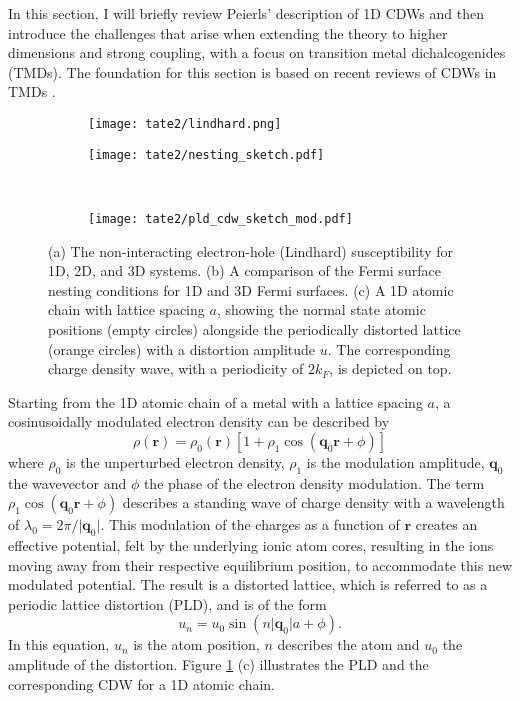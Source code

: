 In this section, I will briefly review Peierls' description of 1D CDWs and then introduce the challenges that arise when extending the theory to higher dimensions and strong coupling, with a focus on transition metal dichalcogenides (TMDs).
The foundation for this section is based on recent reviews of CDWs in TMDs \cite{rossnagel_origin_2011, canadell_importance_1992}.


\begin{figure}[t]
	\centering
	\begin{subfigure}[b]{0.45\textwidth}
		\texttt{[image: tate2/lindhard.png]}
	\end{subfigure}
	\hfill
	\begin{subfigure}[b]{0.5\textwidth}
		\texttt{[image: tate2/nesting\_sketch.pdf]}
	\end{subfigure}
	\\
	\begin{subfigure}[b]{0.9\textwidth}
		\texttt{[image: tate2/pld\_cdw\_sketch\_mod.pdf]}
	\end{subfigure}
	\caption{(a) The non-interacting electron-hole (Lindhard) susceptibility for 1D, 2D, and 3D systems. (b) A comparison of the Fermi surface nesting conditions for 1D and 3D Fermi surfaces. (c) A 1D atomic chain with lattice spacing $a$, showing the normal state atomic positions (empty circles) alongside the periodically distorted lattice (orange circles) with a distortion amplitude $u$. The corresponding charge density wave, with a periodicity of $2k_F$, is depicted on top.}
	\label{fig:cdw_theory}
\end{figure}

Starting from the 1D atomic chain of a metal with a lattice spacing $a$, a cosinusoidally modulated electron density can be described by
\begin{equation}
	\rho(\mathbf{r}) = \rho_0(\mathbf{r})[1+\rho_1 \cos(\mathbf{q}_0\mathbf{r}+\phi)]
	\label{eq:cdw}
\end{equation}
where $\rho_0$ is the unperturbed electron density, $\rho_1$ is the modulation amplitude, $\mathbf{q}_0$ the wavevector and $\phi$ the phase of the electron density modulation.
The term $\rho_1 \cos(\mathbf{q}_0\mathbf{r}+\phi)$ describes a standing wave of charge density with a wavelength of $\lambda_0 = 2\pi/\lvert \mathbf{q}_0\rvert$.
This modulation of the charges as a function of $\mathbf{r}$ creates an effective potential, felt by the underlying ionic atom cores, resulting in the ions moving away from their respective equilibrium position, to accommodate this new modulated potential.
The result is a distorted lattice, which is referred to as a periodic lattice distortion (PLD), and is of the form
\begin{equation}
	u_n = u_0 \sin(n\lvert \mathbf{q}_0\rvert a+\phi).
	\label{eq:pld}
\end{equation}
In this equation, $u_n$ is the atom position, $n$ describes the atom and $u_0$ the amplitude of the distortion.
Figure \ref{fig:cdw_theory} (c) illustrates the PLD and the corresponding CDW for a 1D atomic chain.

